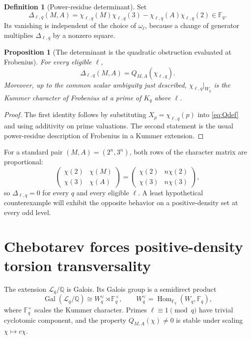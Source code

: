 \documentclass[11pt]{article}
\numberwithin{equation}{section}
\newtheorem{proposition}[theorem]{Proposition}
\theoremstyle{definition}
\newtheorem{definition}[theorem]{Definition}
\theoremstyle{remark}
\newcommand{\Q}{\mathbb Q}
\newcommand{\F}{\mathbb F}
\newcommand{\Gal}{\operatorname{Gal}}
\begin{document}
\begin{definition}[Power-residue determinant]
\label{def:delta}
Set
\begin{equation}
 \Delta_{\ell,q}(M,A)
 =\chi_{\ell,q}(M)\chi_{\ell,q}(3)
  -\chi_{\ell,q}(A)\chi_{\ell,q}(2)
 \in\F_q.\label{eq:delta}
\end{equation}
Its vanishing is independent of the choice of \(\omega_\ell\), because a change of generator
multiplies \(\Delta_{\ell,q}\) by a nonzero square.
\end{definition}

\begin{proposition}[The determinant is the quadratic obstruction evaluated at Frobenius]
\label{prop:deltaQ}
For every eligible \(\ell\),
\begin{equation}
 \Delta_{\ell,q}(M,A)=Q_{M,A}(\chi_{\ell,q}).\label{eq:deltaQ}
\end{equation}
Moreover, up to the common scalar ambiguity just described, \(\chi_{\ell,q}|_{W_q}\) is the
Kummer character of Frobenius at a prime of \(K_q\) above \(\ell\).
\end{proposition}

\begin{proof}
The first identity follows by substituting \(X_p=\chi_{\ell,q}(p)\) into
\eqref{eq:Qdef} and using additivity on prime valuations.  The second statement is the usual
power-residue description of Frobenius in a Kummer extension.
\end{proof}

For a standard pair \((M,A)=(2^n,3^n)\), both rows of the character matrix are proportional:
\[
 \begin{pmatrix}
 \chi(2)&\chi(M)\\
 \chi(3)&\chi(A)
 \end{pmatrix}
 =
 \begin{pmatrix}
 \chi(2)&n\chi(2)\\
 \chi(3)&n\chi(3)
 \end{pmatrix},
\]
so \(\Delta_{\ell,q}=0\) for every \(q\) and every eligible \(\ell\).  A least hypothetical
counterexample will exhibit the opposite behavior on a positive-density set at every odd
level.

\section{Chebotarev forces positive-density torsion transversality}
\label{sec:chebotarev}

The extension \(\mathcal L_q/\Q\) is Galois.  Its Galois group is a semidirect product
\begin{equation}
 \Gal(\mathcal L_q/\Q)
 \cong W_q^\vee\rtimes\F_q^\times,
 \qquad W_q^\vee=\operatorname{Hom}_{\F_q}(W_q,\F_q),\label{eq:semidirect}
\end{equation}
where \(\F_q^\times\) scales the Kummer character.  Primes
\(\ell\equiv1\pmod q\) have trivial cyclotomic component, and the property
\(Q_{M,A}(\chi)\ne0\) is stable under scaling \(\chi\mapsto c\chi\).
\end{document}

